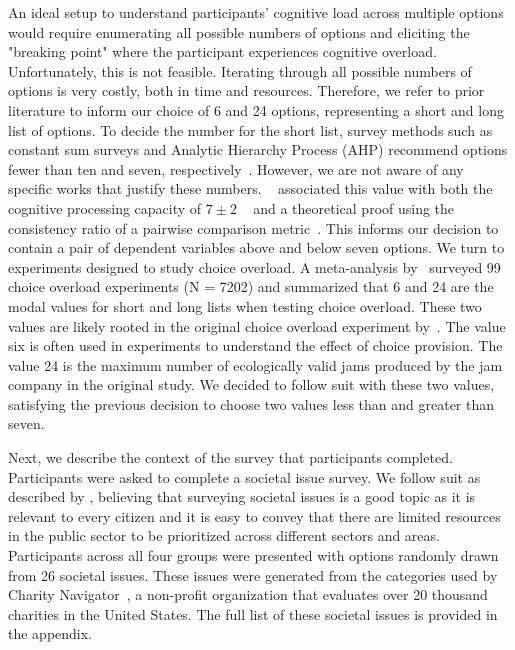 An ideal setup to understand participants' cognitive load across multiple options would require enumerating all possible numbers of options and eliciting the "breaking point" where the participant experiences cognitive overload. Unfortunately, this is not feasible. Iterating through all possible numbers of options is very costly, both in time and resources. Therefore, we refer to prior literature to inform our choice of 6 and 24 options, representing a short and long list of options. To decide the number for the short list, survey methods such as constant sum surveys and Analytic Hierarchy Process (AHP) recommend options fewer than ten and seven, respectively~\cite{moroneyQuestionnaireDesignHow2019, saaty2013group, saaty1987principles}. However, we are not aware of any specific works that justify these numbers. ~\textcite{saaty1987principles} associated this value with both the cognitive processing capacity of $7\pm2$ ~\cite{miller1956magical} and a theoretical proof using the consistency ratio of a pairwise comparison metric~\cite{saaty2003magic}. This informs our decision to contain a pair of dependent variables above and below seven options. We turn to experiments designed to study choice overload. A meta-analysis by~\textcite{chernev2015choice} surveyed 99 choice overload experiments (N = 7202) and summarized that 6 and 24 are the modal values for short and long lists when testing choice overload. These two values are likely rooted in the original choice overload experiment by~\textcite{iyengarWhenChoiceDemotivating2000}. The value six is often used in experiments to understand the effect of choice provision. The value 24 is the maximum number of ecologically valid jams produced by the jam company in the original study. We decided to follow suit with these two values, satisfying the previous decision to choose two values less than and greater than seven.

Next, we describe the context of the survey that participants completed. Participants were asked to complete a societal issue survey. We follow suit as described by \textcite{chengCanShowWhat2021}, believing that surveying societal issues is a good topic as it is relevant to every citizen and it is easy to convey that there are limited resources in the public sector to be prioritized across different sectors and areas. Participants across all four groups were presented with options randomly drawn from 26 societal issues. These issues were generated from the categories used by Charity Navigator~\cite{CharityNavigatorAnimals2023}, a non-profit organization that evaluates over 20 thousand charities in the United States. The full list of these societal issues is provided in the appendix.


